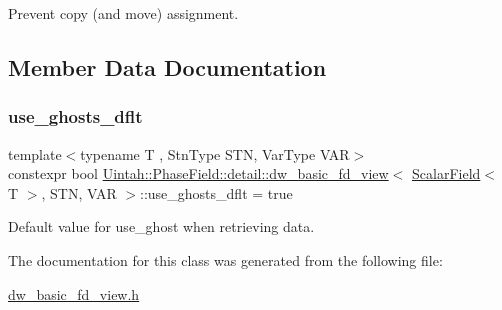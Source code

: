 Prevent copy (and move) assignment. 



\subsection{Member Data Documentation}
\mbox{\label{classUintah_1_1PhaseField_1_1detail_1_1dw__basic__fd__view_3_01ScalarField_3_01T_01_4_00_01STN_00_01VAR_01_4_a2e418e1016be0d58b9f1fbcaf16f2fa5}} 
\subsubsection{\texorpdfstring{use\+\_\+ghosts\+\_\+dflt}{use\_ghosts\_dflt}}
{\footnotesize\ttfamily template$<$typename T , Stn\+Type S\+TN, Var\+Type V\+AR$>$ \\
constexpr bool \hyperlink{classUintah_1_1PhaseField_1_1detail_1_1dw__basic__fd__view}{Uintah\+::\+Phase\+Field\+::detail\+::dw\+\_\+basic\+\_\+fd\+\_\+view}$<$ \hyperlink{structUintah_1_1PhaseField_1_1ScalarField}{Scalar\+Field}$<$ T $>$, S\+TN, V\+AR $>$\+::use\+\_\+ghosts\+\_\+dflt = true\hspace{0.3cm}{\ttfamily [static]}}



Default value for use\+\_\+ghost when retrieving data. 



The documentation for this class was generated from the following file\+:\begin{DoxyCompactItemize}
\item 
\hyperlink{dw__basic__fd__view_8h}{dw\+\_\+basic\+\_\+fd\+\_\+view.\+h}\end{DoxyCompactItemize}
